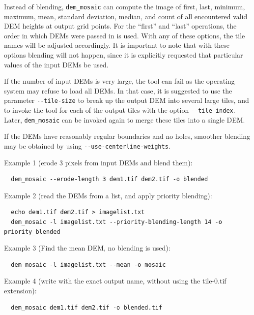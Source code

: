 Instead of blending, \texttt{dem\_mosaic} can compute the image of
first, last, minimum, maximum, mean, standard deviation, median, and
count of all encountered valid \ac{DEM} heights at output grid
points. For the ``first'' and ``last'' operations, the order in which
\acp{DEM} were passed in is used. With any of these options, the tile
names will be adjusted accordingly. It is important to note that with
these options blending will not happen, since it is explicitly
requested that particular values of the input DEMs be used.

If the number of input DEMs is very large, the tool can fail as the operating
system may refuse to load all DEMs. In that case, it is suggested to use
the parameter \texttt{-\/-tile-size} to break up the output DEM into
several large tiles, and to invoke the tool for each of the output tiles
with the option \texttt{-\/-tile-index}. Later, \texttt{dem\_mosaic} can be
invoked again to merge these tiles into a single DEM.

If the DEMs have reasonably regular boundaries and no holes, smoother 
blending may be obtained by using \texttt{-\/-use-centerline-weights}.

Example 1 (erode 3 pixels from input DEMs and blend them):
\begin{verbatim}
  dem_mosaic --erode-length 3 dem1.tif dem2.tif -o blended
\end{verbatim}

Example 2 (read the DEMs from a list, and apply priority blending):
\begin{verbatim}
  echo dem1.tif dem2.tif > imagelist.txt
  dem_mosaic -l imagelist.txt --priority-blending-length 14 -o priority_blended
\end{verbatim}

Example 3 (Find the mean DEM, no blending is used):
\begin{verbatim}
  dem_mosaic -l imagelist.txt --mean -o mosaic
\end{verbatim}

Example 4 (write with the exact output name, without using the tile-0.tif extension):
\begin{verbatim}
  dem_mosaic dem1.tif dem2.tif -o blended.tif
\end{verbatim}


